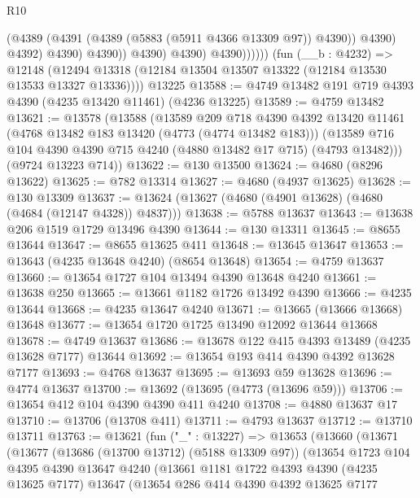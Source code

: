 \begin{lexlean}{R10}
\begin{coremodule}
                            (@4389 (@4391 (@4389 (@5883 (@5911 @4366 @13309 @97)) @4390)) @4390)
                            @4392)
                          @4390)
                        @4390))
                    @4390)
                  @4390)
                @4390))))))
    (fun (__b : @4232) =>
    @12148 (@12494 @13318 (@12184 @13504 @13507 @13322 (@12184 @13530 @13533 @13327 @13336))))
    @13225
@13588 := @4749 @13482 @191 @719 @4393 @4390 (@4235 @13420 @11461) (@4236 @13225)
@13589 := @4759 @13482
@13621 := @13578
    (@13588
      (@13589
        @209
        @718
        @4390
        @4392
        @13420
        @11461
        (@4768 @13482 @183 @13420 (@4773 (@4774 @13482 @183)))
        (@13589 @716 @104 @4390 @4390 @715 @4240 (@4880 @13482 @17 @715) (@4793 @13482)))
      (@9724 @13223 @714))
@13622 := @130 @13500
@13624 := @4680 (@8296 @13622)
@13625 := @782 @13314
@13627 := @4680 (@4937 @13625)
@13628 := @130 @13309
@13637 := @13624 (@13627 (@4680 (@4901 @13628) (@4680 (@4684 (@12147 @4328)) @4837)))
@13638 := @5788 @13637
@13643 := @13638 @206 @1519 @1729 @13496 @4390
@13644 := @130 @13311
@13645 := @8655 @13644
@13647 := @8655 @13625 @411
@13648 := @13645 @13647
@13653 := @13643 (@4235 @13648 @4240) (@8654 @13648)
@13654 := @4759 @13637
@13660 := @13654 @1727 @104 @13494 @4390 @13648 @4240
@13661 := @13638 @250
@13665 := @13661 @1182 @1726 @13492 @4390
@13666 := @4235 @13644
@13668 := @4235 @13647 @4240
@13671 := @13665 (@13666 @13668) @13648
@13677 := @13654 @1720 @1725 @13490 @12092 @13644 @13668
@13678 := @4749 @13637
@13686 := @13678 @122 @415 @4393 @13489 (@4235 @13628 @7177) @13644
@13692 := @13654 @193 @414 @4390 @4392 @13628 @7177
@13693 := @4768 @13637
@13695 := @13693 @59 @13628
@13696 := @4774 @13637
@13700 := @13692 (@13695 (@4773 (@13696 @59)))
@13706 := @13654 @412 @104 @4390 @4390 @411 @4240
@13708 := @4880 @13637 @17
@13710 := @13706 (@13708 @411)
@13711 := @4793 @13637
@13712 := @13710 @13711
@13763 := @13621
    (fun ("_" : @13227) =>
    @13653
      (@13660
        (@13671
          (@13677
            (@13686 (@13700 @13712) (@5188 @13309 @97))
            (@13654
              @1723
              @104
              @4395
              @4390
              @13647
              @4240
              (@13661
                @1181
                @1722
                @4393
                @4390
                (@4235 @13625 @7177)
                @13647
                (@13654
                  @286
                  @414
                  @4390
                  @4392
                  @13625
                  @7177

\end{coremodule}
\end{lexlean}
